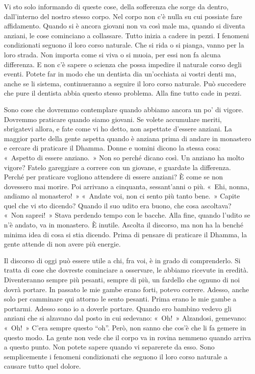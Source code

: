 Vi sto solo informando di queste cose, della sofferenza che sorge da
dentro, dall'interno del nostro stesso corpo. Nel corpo non c'è nulla su
cui possiate fare affidamento. Quando si è ancora giovani non va così
male ma, quando si diventa anziani, le cose cominciano a collassare.
Tutto inizia a cadere in pezzi. I fenomeni condizionati seguono il loro
corso naturale. Che si rida o si pianga, vanno per la loro strada. Non
importa come si viva o si muoia, per essi non fa alcuna differenza. E
non c'è sapere o scienza che possa impedire il naturale corso degli
eventi. Potete far in modo che un dentista dia un'occhiata ai vostri
denti ma, anche se li sistema, continueranno a seguire il loro corso
naturale. Può succedere che pure il dentista abbia questo stesso
problema. Alla fine tutto cade in pezzi.

Sono cose che dovremmo contemplare quando abbiamo ancora un po' di
vigore. Dovremmo praticare quando siamo giovani. Se volete accumulare
meriti, sbrigatevi allora, e fate come vi ho detto, non aspettate
d'essere anziani. La maggior parte della gente aspetta quando è anziana
prima di andare in monastero e cercare di praticare il Dhamma. Donne e
uomini dicono la stessa cosa: «~Aspetto di essere anziano.~» Non so
perché dicano così. Un anziano ha molto vigore? Fatelo gareggiare a
correre con un giovane, e guardate la differenza. Perché per praticare
vogliono attendere di essere anziani? È come se non dovessero mai
morire. Poi arrivano a cinquanta, sessant'anni o più. «~Ehi, nonna,
andiamo al monastero!~» «~Andate voi, non ci sento più tanto bene.~»
Capite quel che vi sto dicendo? Quando il suo udito era buono, che cosa
ascoltava? «~Non saprei!~» Stava perdendo tempo con le bacche. Alla
fine, quando l'udito se n'è andato, va in monastero. È inutile. Ascolta
il discorso, ma non ha la benché minima idea di cosa si stia dicendo.
Prima di pensare di praticare il Dhamma, la gente attende di non avere
più energie.

Il discorso di oggi può essere utile a chi, fra voi, è in grado di
comprenderlo. Si tratta di cose che dovreste cominciare a osservare, le
abbiamo ricevute in eredità. Diventeranno sempre più pesanti, sempre di
più, un fardello che ognuno di noi dovrà portare. In passato le mie
gambe erano forti, potevo correre. Adesso, anche solo per camminare qui
attorno le sento pesanti. Prima erano le mie gambe a portarmi. Adesso
sono io a doverle portare. Quando ero bambino vedevo gli anziani che si
alzavano dal posto in cui sedevano: «~Oh!~» Alzandosi, gemevano: «~Oh!~»
C'era sempre questo ``oh''. Però, non sanno che cos'è che li fa gemere
in questo modo. La gente non vede che il corpo va in rovina nemmeno
quando arriva a questo punto. Non potete sapere quando vi separerete da
esso. Sono semplicemente i fenomeni condizionati che seguono il loro
corso naturale a causare tutto quel dolore.


